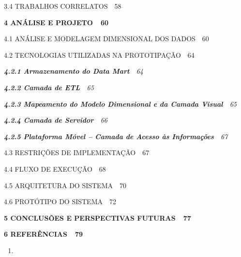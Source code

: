 \documentclass[a4paper]{article}
\newcommand\textstyleTtuloChar[1]{\textsf{\textbf{#1}}}
\newcommand\liststyleWWviiiNumi{%
\renewcommand\theenumi{\arabic{enumi}}
\renewcommand\theenumii{\arabic{enumi}.\arabic{enumii}}
\renewcommand\theenumiii{\arabic{enumi}.\arabic{enumii}.\arabic{enumiii}}
\renewcommand\theenumiv{\arabic{enumi}.\arabic{enumii}.\arabic{enumiii}.\arabic{enumiv}}
\renewcommand\labelenumi{\theenumi}
\renewcommand\labelenumii{\theenumii}
\renewcommand\labelenumiii{\theenumiii}
\renewcommand\labelenumiv{\theenumiv.}
}
\begin{document}
{\sffamily\scshape
3.4 TRABALHOS CORRELATOS\ \ 58}

{\sffamily\scshape
\textstyleTtuloChar{4 AN\'ALISE E PROJETO\textmd{\ \ 60}}}

{\sffamily\scshape
4.1 AN\'ALISE E MODELAGEM DIMENSIONAL DOS DADOS\ \ 60}

{\sffamily\scshape
4.2 TECNOLOGIAS UTILIZADAS NA PROTOTIPA\c{C}\~AO\ \ 64}

{\sffamily\itshape
\textbf{\textup{4.2.1 Armazenamento do Data Mart}}\textup{\ \ 64}}

{\sffamily\itshape
\textbf{\textup{4.2.2 Camada de ETL}}\textup{\ \ 65}}

{\sffamily\itshape
\textbf{\textup{4.2.3 Mapeamento do Modelo Dimensional e da Camada Visual}}\textup{\ \ 65}}

{\sffamily\itshape
\textbf{\textup{4.2.4 Camada de Servidor}}\textup{\ \ 66}}

{\sffamily\itshape
\textbf{\textup{4.2.5 Plataforma M\'ovel -- Camada de Acesso \`as Informa\c{c}\~oes}}\textup{\ \ 67}}

{\sffamily\scshape
4.3 RESTRI\c{C}\~OES DE IMPLEMENTA\c{C}\~AO\ \ 67}

{\sffamily\scshape
4.4 FLUXO DE EXECU\c{C}\~AO\ \ 68}

{\sffamily\scshape
4.5 ARQUITETURA DO SISTEMA\ \ 70}

{\sffamily\scshape
4.6 PROT\'OTIPO DO SISTEMA\ \ 72}

{\sffamily\bfseries
\textstyleTtuloChar{5 CONCLUS\~OES E PERSPECTIVAS FUTURAS\textmd{\ \ }\foreignlanguage{portuges}{\textmd{77}}}}

{\sffamily\bfseries
\textstyleTtuloChar{6 REFER\^ENCIAS\textmd{\ \ 7}\foreignlanguage{portuges}{\textmd{9}}}}


\bigskip


\bigskip


\bigskip

\liststyleWWviiiNumi
\begin{enumerate}
\item {}
\end{enumerate}
\end{document}
